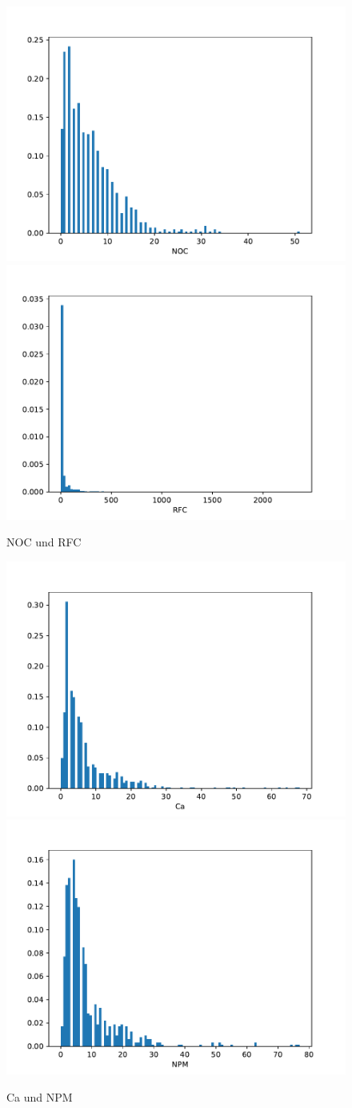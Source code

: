 \documentclass{scrreprt}
\begin{document}
\begin{figure}
 \includegraphics[width=.45\textwidth]{./NOC.pdf}
  \includegraphics[width=.45\textwidth]{./RFC.pdf}
 \caption{NOC und RFC}
 \label{abb:noc_rfc}
\end{figure}


\begin{figure}
 \includegraphics[width=.45\textwidth]{./Ca.pdf}
  \includegraphics[width=.45\textwidth]{./NPM.pdf}
 \caption{Ca und NPM}
 \label{abb:ca_npm}
\end{figure}
\end{document}
